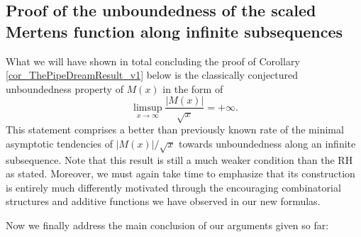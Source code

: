 \documentclass[11pt,reqno,a4letter]{article}
\numberwithin{figure}{section}
\numberwithin{table}{section}
\newcommand{\floor}[1]{\left\lfloor #1 \right\rfloor}
\theoremstyle{plain}
\numberwithin{theorem}{section}
\theoremstyle{definition}
\newtheorem{remark}[theorem]{Remark}
\begin{document}

\subsection{Proof of the unboundedness of the scaled Mertens function along infinite subsequences}
\label{subSection_TheCoreResultProof} 

What we will have shown in total concluding the proof of 
Corollary \ref{cor_ThePipeDreamResult_v1} below is the classically conjectured 
unboundedness property of $M(x)$ in the form of 
\[
\limsup_{x \rightarrow \infty} \frac{|M(x)|}{\sqrt{x}} = +\infty. 
\]
This statement comprises a better than previously known rate of the minimal asymptotic tendencies of 
$|M(x)| / \sqrt{x}$ towards unboundedness along an infinite subsequence. 
Note that this result is still a much weaker condition than the RH as stated. Moreover, 
we must again take time to emphasize that its construction is entirely much differently 
motivated through the encouraging combinatorial structures and additive functions 
we have observed in our new formulas. 

Now we finally address the main conclusion of our arguments given so far: 
\end{document}
